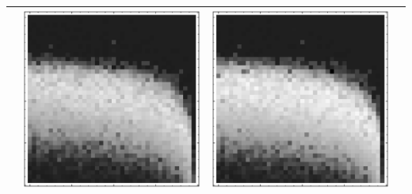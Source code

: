 \documentclass[10pt]{article}
\begin{document}
\begin{tabular}{|c|c|c|c|}
        & \includegraphics[scale=0.25]{plots/simple/LF-20BR10BR-20T10-CIFAR-2.eps}
        & \includegraphics[scale=0.25]{plots/simple/LF-20BR10BR-20T10-CIFAR-3.eps} \\ \hline
\end{tabular}
\end{document}
